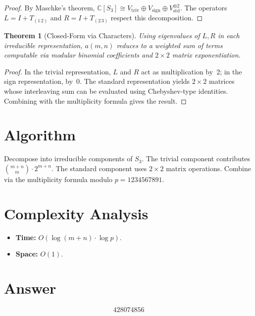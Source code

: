 \documentclass[11pt]{article}
\newtheorem{theorem}{Theorem}
\begin{document}
\begin{proof}
By Maschke's theorem, $\mathbb{C}[S_3]\cong V_{\mathrm{triv}}\oplus V_{\mathrm{sign}}\oplus V_{\mathrm{std}}^{\oplus 2}$. The operators $L=I+T_{(1\,2)}$ and $R=I+T_{(2\,3)}$ respect this decomposition.
\end{proof}

\begin{theorem}[Closed-Form via Characters]
Using eigenvalues of $L,R$ in each irreducible representation, $a(m,n)$ reduces to a weighted sum of terms computable via modular binomial coefficients and $2\times 2$ matrix exponentiation.
\end{theorem}

\begin{proof}
In the trivial representation, $L$ and $R$ act as multiplication by~2; in the sign representation, by~0. The standard representation yields $2\times 2$ matrices whose interleaving sum can be evaluated using Chebyshev-type identities. Combining with the multiplicity formula gives the result.
\end{proof}

\section{Algorithm}

Decompose into irreducible components of $S_3$. The trivial component contributes $\binom{m+n}{m}\cdot 2^{m+n}$. The standard component uses $2\times 2$ matrix operations. Combine via the multiplicity formula modulo $p=1234567891$.

\section{Complexity Analysis}

\begin{itemize}
\item \textbf{Time:} $O(\log(m+n)\cdot\log p)$.
\item \textbf{Space:} $O(1)$.
\end{itemize}

\section{Answer}

\[
\boxed{428074856}
\]
\end{document}

